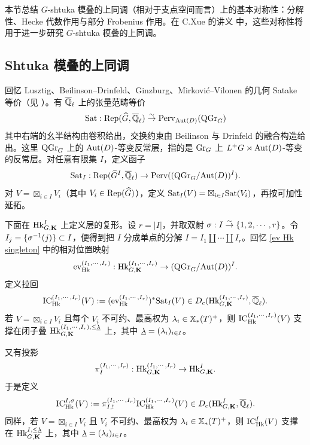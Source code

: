 本节总结 $G$-shtuka 模叠的上同调（相对于支点空间而言）上的基本对称性：分解性、Hecke 代数作用与部分 Frobenius 作用。在 C.Xue 的讲义 \cite{Xue} 中，这些对称性将用于进一步研究 $G$-shtuka 模叠的上同调。

\subsection{Shtuka 模叠的上同调}


回忆 Lusztig、Beilinson--Drinfeld、Ginzburg、Mirkovi\'c--Vilonen 的几何 Satake 等价（见 \cite{MV}）。有 $\overline{\mathbb{Q}}_\ell$ 上的张量范畴等价
\begin{equation*}
\mathrm{Sat}: \textup{Rep}(\widehat{G},\overline{\mathbb{Q}}_\ell)\stackrel{\sim}{\to} \textup{Perv}_{\textup{Aut}(D)}(\mathrm{QGr}_{G})
\end{equation*}
其中右端的幺半结构由卷积给出，交换约束由 Beilinson 与 Drinfeld 的融合构造给出。这里 $\mathrm{QGr}_{G}$ 上的 $\textup{Aut}(D)$-等变反常层，指的是 $\textup{Gr}_{G}$ 上 $L^{+}G\rtimes\textup{Aut}(D)$-等变的反常层。对任意有限集 $I$，定义函子
\begin{equation*}
\mathrm{Sat}_{I}: \textup{Rep}(\widehat{G}^{I},\overline{\mathbb{Q}}_\ell)\to\textup{Perv}((\mathrm{QGr}_{G}/\textup{Aut}(D))^{I}).
\end{equation*}
对 $V=\boxtimes_{i\in I}V_{i}$（其中 $V_{i}\in \textup{Rep}(\widehat{G})$），定义 $\mathrm{Sat}_{I}(V)=\boxtimes_{i\in I}\mathrm{Sat}(V_{i})$，再按可加性延拓。

下面在 $\textup{Hk}^{I}_{G,\mathbf{K}}$ 上定义层的复形。设 $r=|I|$，并取双射 $\sigma: I\stackrel{\sim}{\to} \{1,2,\cdots, r\}$。令 $I_{j}=\{\sigma^{-1}(j)\}\subset I$，便得到把 $I$ 分成单点的分解 $I=I_{1}\coprod\cdots\coprod I_{r}$。回忆 \eqref{ev Hk singleton} 中的相对位置映射
\begin{equation*}
\textup{ev}^{(I_{1},\cdots, I_{r})}_{\textup{Hk}}: \textup{Hk}^{(I_{1},\cdots, I_{r})}_{G,\mathbf{K}}\to (\mathrm{QGr}_{G}/\textup{Aut}(D))^{I}.
\end{equation*}
定义拉回
\begin{equation*}
\textup{IC}^{(I_{1},\cdots, I_{r})}_{\textup{Hk}}(V):=(\textup{ev}^{(I_{1},\cdots, I_{r})}_{\textup{Hk}})^{*}\mathrm{Sat}_{I}(V)\in D_{c}(\textup{Hk}^{(I_{1},\cdots, I_{r})}_{G,\mathbf{K}}, \overline{\mathbb{Q}}_\ell).
\end{equation*}
若 $V=\boxtimes_{i\in I}V_{i}$ 且每个 $V_{i}$ 不可约、最高权为 $\lambda_{i}\in\mathbb{X}_*(T)^{+}$，则 $\textup{IC}^{(I_{1},\cdots, I_{r})}_{\textup{Hk}}(V)$ 支撑在闭子叠 $\textup{Hk}^{(I_{1},\cdots, I_{r}), \le\underline{\lambda}}_{G,\mathbf{K}}$ 上，其中 $\underline{\lambda}=(\lambda_{i})_{i\in I}$。

又有投影
\begin{equation*}
\pi^{(I_{1},\cdots, I_{r})}_{I}: \textup{Hk}^{(I_{1},\cdots, I_{r})}_{G,\mathbf{K}}\to \textup{Hk}^{I}_{G,\mathbf{K}}.
\end{equation*}
于是定义
\begin{equation*}
\textup{IC}^{I,\sigma}_{\textup{Hk}}(V):=\pi^{(I_{1},\cdots, I_{r})}_{I, !}\textup{IC}^{(I_{1},\cdots, I_{r})}_{\textup{Hk}}(V)\in D_{c}(\textup{Hk}^{I}_{G,\mathbf{K}}, \overline{\mathbb{Q}}_\ell).
\end{equation*}
同样，若 $V=\boxtimes_{i\in I}V_{i}$ 且 $V_{i}$ 不可约、最高权为 $\lambda_{i}\in\mathbb{X}_*(T)^{+}$，则 $\textup{IC}^{I}_{\textup{Hk}}(V)$ 支撑在 $\textup{Hk}^{I, \le\underline{\lambda}}_{G,\mathbf{K}}$ 上，其中 $\underline{\lambda}=(\lambda_{i})_{i\in I}$。

